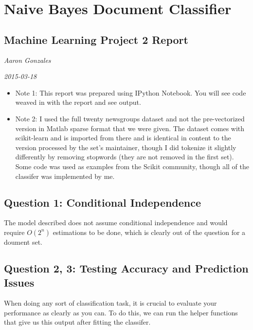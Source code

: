 \documentclass[letterpaper,10pt,english]{/usr/local/lib/python3.4/dist-packages/sphinx/texinputs/sphinxhowto}
\begin{document}
        
    
\section{Naive Bayes Document
Classifier}\label{naive-bayes-document-classifier}

\subsection{Machine Learning Project 2
Report}\label{machine-learning-project-2-report}

\emph{Aaron Gonzales}

\emph{2015-03-18}

\begin{itemize}
\itemsep1pt\parskip0pt
\item
  Note 1: This report was prepared using IPython Notebook. You will see
  code weaved in with the report and see output.
\item
  Note 2: I used the full twenty newsgroups dataset and not the
  pre-vectorized version in Matlab sparse format that we were given. The
  dataset comes with scikit-learn and is imported from there and is
  identical in content to the version processed by the set's maintainer,
  though I did tokenize it slightly differently by removing stopwords
  (they are not removed in the first set). Some code was used as
  examples from the Scikit community, though all of the classifer was
  implemented by me.
\end{itemize}\subsection{Question 1: Conditional
Independence}\label{question-1-conditional-independence}

The model described does not assume conditional independence and would
require \(O(2^n)\) estimations to be done, which is clearly out of the
question for a doument set.\subsection{Question 2, 3: Testing Accuracy and Prediction
Issues}\label{question-2-3-testing-accuracy-and-prediction-issues}

When doing any sort of classification task, it is crucial to evaluate
your performance as clearly as you can. To do this, we can run the
helper functions that give us this output after fitting the classifer.
\end{document}
